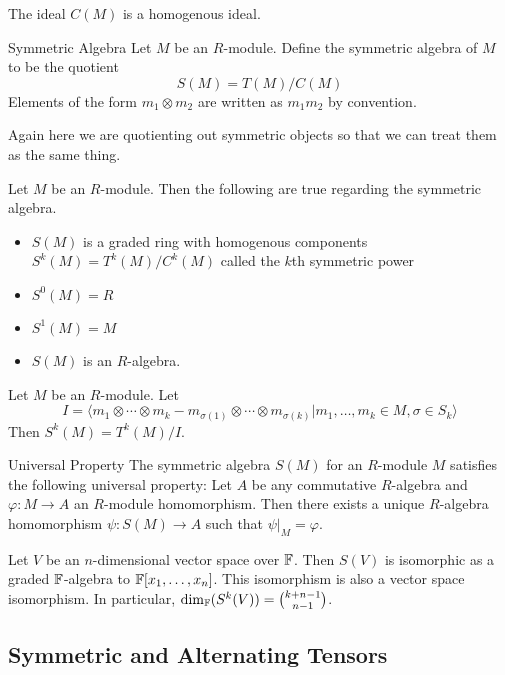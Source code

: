 \documentclass[a4paper]{article}
\begin{document}
\begin{lmm}{}{} The ideal $C(M)$ is a homogenous ideal. 
\end{lmm}

\begin{defn}{Symmetric Algebra}{} Let $M$ be an $R$-module. Define the symmetric algebra of $M$ to be the quotient $$S(M)=T(M)/C(M)$$ Elements of the form $m_1\otimes m_2$ are written as $m_1m_2$ by convention. 
\end{defn}

Again here we are quotienting out symmetric objects so that we can treat them as the same thing. 

\begin{prp}{}{} Let $M$ be an $R$-module. Then the following are true regarding the symmetric algebra. 
\begin{itemize}
\item $S(M)$ is a graded ring with homogenous components $S^k(M)=T^k(M)/C^k(M)$ called the $k$th symmetric power
\item $S^0(M)=R$
\item $S^1(M)=M$
\item $S(M)$ is an $R$-algebra. 
\end{itemize}
\end{prp}

\begin{thm}{}{} Let $M$ be an $R$-module. Let $$I=\langle m_1\otimes\cdots\otimes m_k-m_{\sigma(1)}\otimes\cdots\otimes m_{\sigma(k)}|m_1,\dots,m_k\in M, \sigma\in S_k\rangle$$ Then $S^k(M)=T^k(M)/I$. 
\end{thm}

\begin{thm}{Universal Property}{} The symmetric algebra $S(M)$ for an $R$-module $M$ satisfies the following universal property: Let $A$ be any commutative $R$-algebra and $\varphi:M\to A$ an $R$-module homomorphism. Then there exists a unique $R$-algebra homomorphism $\psi:S(M)\to A$ such that $\psi|_M=\varphi$. 
\end{thm}

\begin{crl}{}{} Let $V$ be an $n$-dimensional vector space over $\mathbb{F}$. Then $S(V)$ is isomorphic as a graded $\mathbb{F}$-algebra to $\mathbb{F}[x_1,\dots,x_n]$. This isomorphism is also a vector space isomorphism. In particular, $\dim_{\mathbb{F}}(S^k(V))=\binom{k+n-1}{n-1}$. 
\end{crl}

\subsection{Symmetric and Alternating Tensors}
\end{document}
